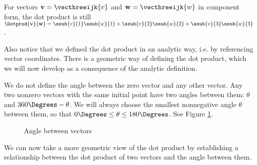 For vectors $\textbf{v} = \vecthreeijk{v}$ and $\textbf{w} = \vecthreeijk{w}$ in component form, the dot product is
still $\Dotprod{\textbf{v}}{\textbf{w}} = \ssub{v}{1}\ssub{w}{1} + \ssub{v}{2}\ssub{w}{2} +
\ssub{v}{3}\ssub{w}{3}$.

Also notice that we defined the dot product in an analytic way, i.e. by referencing vector coordinates. There is
a geometric way of defining the dot product, which we will now develop as a consequence of the analytic
definition.


We do not define the angle between the zero vector and any other vector.
Any two nonzero vectors with the same initial point have two angles between them: $\theta$ and $360\Degrees - \theta$.
We will always choose the smallest nonnegative angle $\theta$ between them, so that $0\Degrees \leq \theta \leq
180\Degrees$. See Figure \ref{fig:angle}.

\begin{figure}[h]
 \centering
 \qquad
 \qquad
 \caption[]{\quad Angle between vectors}
 \label{fig:angle}
\end{figure}

We can now take a more geometric view of
the dot product by establishing a relationship between the dot product of two vectors and the angle between them.


